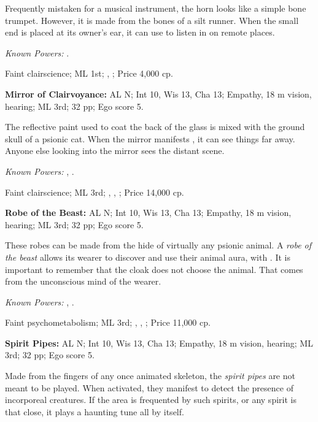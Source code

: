 Frequently mistaken for a musical instrument, the horn looks like a simple bone trumpet. However, it is made from the bones of a silt runner. When the small end is placed at its owner's ear, it can use  to listen in on remote places.

\textit{Known Powers:}
    . %

Faint clairscience;
ML 1st;
,
;
Price 4,000 cp.



\textbf{Mirror of Clairvoyance:}
AL N;
Int 10, Wis 13, Cha 13;
Empathy, 18 m vision, hearing;
ML 3rd;
32 pp;
Ego score 5.

The reflective paint used to coat the back of the glass is mixed with the ground skull of a psionic cat. When the mirror manifests , it can see things far away. Anyone else looking into the mirror sees the distant scene.

\textit{Known Powers:}
    , %
    . %

Faint clairscience;
ML 3rd;
,
,
;
Price 14,000 cp.



\textbf{Robe of the Beast:}
AL N;
Int 10, Wis 13, Cha 13;
Empathy, 18 m vision, hearing;
ML 3rd;
32 pp;
Ego score 5.

These robes can be made from the hide of virtually any psionic animal. A \emph{robe of the beast} allows its wearer to discover and use their animal aura, with . It is important to remember that the cloak does not choose the animal. That comes from the unconscious mind of the wearer.

\textit{Known Powers:}
    , %
    . %

Faint psychometabolism;
ML 3rd;
,
,
;
Price 11,000 cp.



\textbf{Spirit Pipes:}
AL N;
Int 10, Wis 13, Cha 13;
Empathy, 18 m vision, hearing;
ML 3rd;
32 pp;
Ego score 5.

Made from the fingers of any once animated skeleton, the \emph{spirit pipes} are not meant to be played. When activated, they manifest  to detect the presence of incorporeal creatures. If the area is frequented by such spirits, or any spirit is that close, it plays a haunting tune all by itself.

